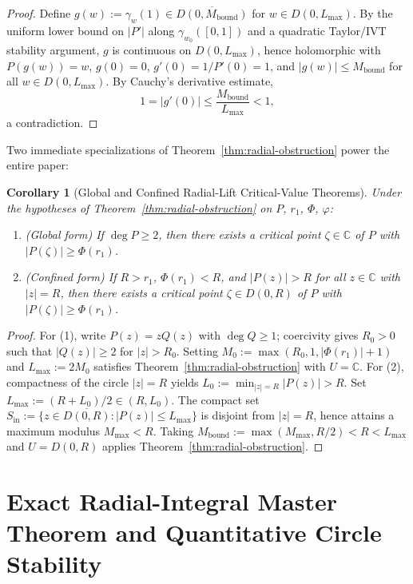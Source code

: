 \documentclass[11pt,a4paper]{article}
\newtheorem{corollary}[theorem]{Corollary}
\theoremstyle{definition}
\theoremstyle{remark}
\newcommand{\CC}{\mathbb{C}}
\begin{document}
\begin{proof}
Define $g(w) := \gamma_w(1) \in \overline{D(0, M_{\mathrm{bound}})}$ for $w \in D(0, L_{\max})$. By the uniform lower bound on $|P'|$ along $\gamma_{w_0}([0, 1])$ and a quadratic Taylor/IVT stability argument, $g$ is continuous on $D(0, L_{\max})$, hence holomorphic with $P(g(w)) = w$, $g(0) = 0$, $g'(0) = 1/P'(0) = 1$, and $|g(w)| \le M_{\mathrm{bound}}$ for all $w \in D(0, L_{\max})$. By Cauchy's derivative estimate,
\[
1 = |g'(0)| \le \frac{M_{\mathrm{bound}}}{L_{\max}} < 1,
\]
a contradiction.
\end{proof}

Two immediate specializations of Theorem~\ref{thm:radial-obstruction} power the entire paper:

\begin{corollary}[Global and Confined Radial-Lift Critical-Value Theorems]
\label{cor:radial-global-confined}
Under the hypotheses of Theorem~\ref{thm:radial-obstruction} on $P$, $r_1$, $\Phi$, $\varphi$:
\begin{enumerate}
\item \emph{(Global form)} If $\deg P \ge 2$, then there exists a critical point $\zeta \in \CC$ of $P$ with $|P(\zeta)| \ge \Phi(r_1)$.
\item \emph{(Confined form)} If $R > r_1$, $\Phi(r_1) < R$, and $|P(z)| > R$ for all $z \in \CC$ with $|z| = R$, then there exists a critical point $\zeta \in D(0, R)$ of $P$ with $|P(\zeta)| \ge \Phi(r_1)$.
\end{enumerate}
\end{corollary}

\begin{proof}
For (1), write $P(z) = z Q(z)$ with $\deg Q \ge 1$; coercivity gives $R_0 > 0$ such that $|Q(z)| \ge 2$ for $|z| > R_0$. Setting $M_0 := \max(R_0, 1, |\Phi(r_1)| + 1)$ and $L_{\max} := 2 M_0$ satisfies Theorem~\ref{thm:radial-obstruction} with $U = \CC$.
For (2), compactness of the circle $|z| = R$ yields $L_0 := \min_{|z|=R} |P(z)| > R$. Set $L_{\max} := (R + L_0)/2 \in (R, L_0)$. The compact set $S_{\mathrm{in}} := \{z \in \overline{D(0, R)} : |P(z)| \le L_{\max}\}$ is disjoint from $|z| = R$, hence attains a maximum modulus $M_{\max} < R$. Taking $M_{\mathrm{bound}} := \max(M_{\max}, R/2) < R < L_{\max}$ and $U = D(0, R)$ applies Theorem~\ref{thm:radial-obstruction}.
\end{proof}

\section{Exact Radial-Integral Master Theorem and Quantitative Circle Stability}
\label{sec:exact-radial}
\end{document}
